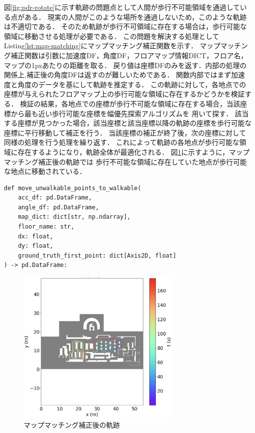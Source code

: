 
図\ref{fig:pdr-rotate}に示す軌跡の問題点として人間が歩行不可能領域を通過している点がある．
現実の人間がこのような場所を通過しないため，このような軌跡は不適切である．
そのため軌跡が歩行不可領域に存在する場合は，歩行可能な領域に移動させる処理が必要である．
この問題を解決する処理としてListing\ref{lst:map-matching}にマップマッチング補正関数を示す．
マップマッチング補正関数は引数に加速度DF，角度DF，フロアマップ情報DICT，フロア名，マップの1pxあたりの距離を取る．
戻り値は座標DFのみを返す．内部の処理の関係上,補正後の角度DFは返すのが難しいためである．
関数内部ではまず加速度と角度のデータを基にして軌跡を推定する．
この軌跡に対して，各地点での座標が与えられたフロアマップ上の歩行可能な領域に存在するかどうかを検証する．
検証の結果，各地点での座標が歩行不可能な領域に存在する場合，当該座標から最も近い歩行可能な座標を幅優先探索アルゴリズムを
用いて探す．
該当する座標が見つかった場合，該当座標と該当座標以降の軌跡の座標を歩行可能な座標に平行移動して補正を行う．
当該座標の補正が終了後，次の座標に対して同様の処理を行う処理を繰り返す．
これによって軌跡の各地点が歩行可能な領域に存在するようになり，軌跡全体が最適化される．
図\ref{fig:map-matching}に示すように，マップマッチング補正後の軌跡では
歩行不可能な領域に存在していた地点が歩行可能な地点に移動されている．


\begin{lstlisting}[caption={マップマッチング補正}, label=lst:map-matching]
def move_unwalkable_points_to_walkable(
    acc_df: pd.DataFrame,
    angle_df: pd.DataFrame,
    map_dict: dict[str, np.ndarray],
    floor_name: str,
    dx: float,
    dy: float,
    ground_truth_first_point: dict[Axis2D, float]
) -> pd.DataFrame:

\end{lstlisting}

\begin{figure}[h]
	\centering
	\includegraphics[width=80mm]{image/map-matching.jpg}
	\caption{マップマッチング補正後の軌跡}    \label{fig:map-matching}
\end{figure}
